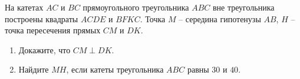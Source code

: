 \begin{ex}
	\begin{condition}
		На катетах \( AC  \) и \( BC  \) прямоугольного треугольника \( ABC  \) вне	треугольника построены квадраты \( ACDE  \) и \( BFKC \). Точка \( M \) – середина гипотенузы \( AB \), \( H \) – точка пересечения прямых \( CM  \) и \( DK \).
		\begin{enumerate}
			\item Докажите, что \( CM\perp DK \).
			\item Найдите \( MH \), если катеты треугольника \( ABC  \) равны \( 30  \) и \( 40 \).
		\end{enumerate}
	\end{condition}
\end{ex}